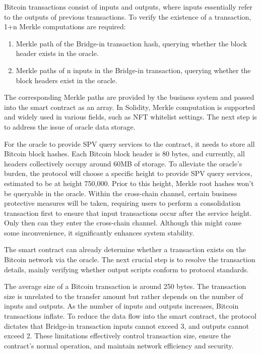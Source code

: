 \documentclass{article}
\begin{document}
\par Bitcoin transactions consist of inputs and outputs, where inputs essentially refer to the outputs of previous transactions. To verify the existence of a transaction, 1+n Merkle computations are required:
\begin{enumerate}
    \item Merkle path of the Bridge-in transaction hash, querying whether the block header exists in the oracle.
    \item Merkle paths of n inputs in the Bridge-in transaction, querying whether the block headers exist in the oracle.
\end{enumerate}
\par The corresponding Merkle paths are provided by the business system and passed into the smart contract as an array. In Solidity, Merkle computation is supported and widely used in various fields, such as NFT whitelist settings. The next step is to address the issue of oracle data storage.
\par For the oracle to provide SPV query services to the contract, it needs to store all Bitcoin block hashes. Each Bitcoin block header is 80 bytes, and currently, all headers collectively occupy around 60MB of storage. To alleviate the oracle's burden, the protocol will choose a specific height to provide SPV query services, estimated to be at height 750,000. Prior to this height, Merkle root hashes won't be queryable in the oracle. Within the cross-chain channel, certain business protective measures will be taken, requiring users to perform a consolidation transaction first to ensure that input transactions occur after the service height. Only then can they enter the cross-chain channel. Although this might cause some inconvenience, it significantly enhances system stability.
\par The smart contract can already determine whether a transaction exists on the Bitcoin network via the oracle. The next crucial step is to resolve the transaction details, mainly verifying whether output scripts conform to protocol standards.
\par The average size of a Bitcoin transaction is around 250 bytes. The transaction size is unrelated to the transfer amount but rather depends on the number of inputs and outputs. As the number of inputs and outputs increases, Bitcoin transactions inflate. To reduce the data flow into the smart contract, the protocol dictates that Bridge-in transaction inputs cannot exceed 3, and outputs cannot exceed 2. These limitations effectively control transaction size, ensure the contract's normal operation, and maintain network efficiency and security.
\end{document}
